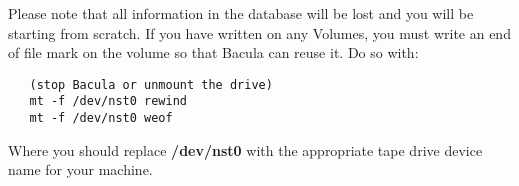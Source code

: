 Please note that all information in the database will be lost and you will be
starting from scratch. If you have written on any Volumes, you must write an
end of file mark on the volume so that Bacula can reuse it. Do so with: 

\footnotesize
\begin{verbatim}
   (stop Bacula or unmount the drive)
   mt -f /dev/nst0 rewind
   mt -f /dev/nst0 weof
\end{verbatim}
\normalsize

Where you should replace {\bf /dev/nst0} with the appropriate tape drive
device name for your machine. 

